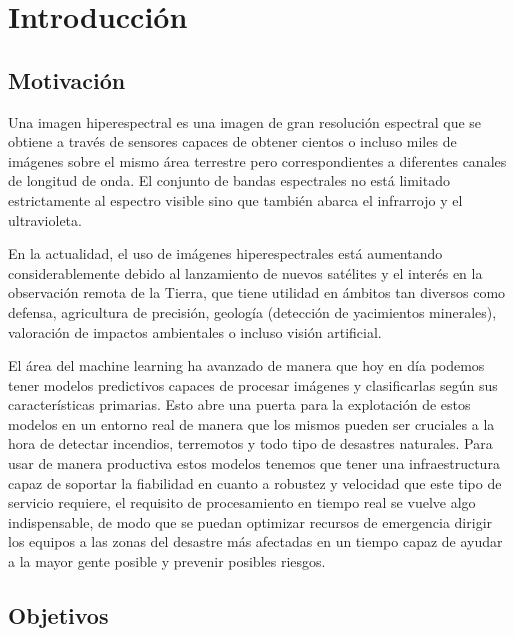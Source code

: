 \cleardoublepage


\chapter{Introducción}
\label{ch:chapter1}


\section{Motivación}

Una imagen hiperespectral es una imagen de gran resolución espectral que se obtiene a través de sensores capaces de obtener cientos o incluso miles de imágenes sobre el mismo área terrestre
pero correspondientes a diferentes canales de longitud de onda.
El conjunto de bandas espectrales no está limitado estrictamente al espectro visible sino que también abarca el infrarrojo y el ultravioleta.

En la actualidad, el uso de imágenes hiperespectrales está aumentando considerablemente debido al lanzamiento de nuevos satélites y el interés en la observación remota de la Tierra,
que tiene utilidad en ámbitos tan diversos como defensa, agricultura de precisión, geología (detección de yacimientos minerales), valoración de impactos ambientales o incluso visión artificial.

El área del machine learning ha avanzado de manera que hoy en día podemos tener modelos predictivos capaces de procesar imágenes y clasificarlas según sus características primarias.
Esto abre una puerta para la explotación de estos modelos en un entorno real de manera que los mismos pueden ser cruciales a la hora de detectar incendios, terremotos y todo tipo de
desastres naturales.
Para usar de manera productiva estos modelos tenemos que tener una infraestructura capaz de soportar la fiabilidad en cuanto a robustez y velocidad que este tipo de servicio requiere, el requisito de
procesamiento en tiempo real se vuelve algo indispensable, de modo que se puedan optimizar recursos de emergencia dirigir los equipos a las zonas del desastre más afectadas en un tiempo
capaz de ayudar a la mayor gente posible y prevenir posibles riesgos.


\section{Objetivos}

